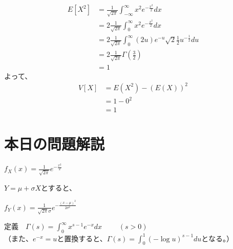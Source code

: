 \documentclass[a4j,uplatex,dvipdfmx]{jsarticle}
\begin{document}
\begin{itemize}
  \begin{equation}
    \begin{split}
      E[X^2]&=\frac{1}{\sqrt{2\pi}} \int_{-\infty}^{\infty} x^2 e^{-\frac{x^2}{2}}dx \\
      &= 2 \frac{1}{\sqrt{2\pi}} \int_{0}^{\infty} x^2e^{-\frac{x^2}{2}} dx \\
      &= 2 \frac{1}{\sqrt{2\pi}} \int_{0}^{\infty} (2u)e^{-u} \sqrt{2} \frac{1}{2}u^{-\frac{1}{2}}du \\
      &= 2 \frac{1}{\sqrt{2\pi}} \Gamma \left( \frac{3}{2} \right) \\
      &= 1
    \end{split}
  \end{equation}
  よって、
  \begin{equation}
    \begin{split}
      V[X]&=E(X^2)-(E(X))^2 \\
      &= 1-0^2 \\
      &=1 
    \end{split}
  \end{equation}
\end{itemize}


\section*{本日の問題解説}
\begin{tcolorbox}[
  title = 標準正規分布,
]
  \begin{center}
    $\displaystyle f_X(x)=\frac{1}{\sqrt{2\pi}} e^{-\frac{x^2}{2}}$
  \end{center}
  \end{tcolorbox}
  
\begin{tcolorbox}[
  title = 正規分布,
  ]
  $Y=\mu + \sigma X$とすると、
  \begin{center}
    $\displaystyle f_Y(x)=\frac{1}{\sqrt{2\pi}\sigma} e^{-\frac{(x-\mu)^2}{2\sigma ^2}}$
  \end{center}
  \end{tcolorbox}

\begin{tcolorbox}[
  title = ガンマ関数,
  ]
    定義　$\displaystyle \Gamma (s)=\int_{0}^{\infty}x^{s-1}e^{-x}dx$ \ \ \ \ $(s>0)$ \\
    （また、$e^{-x}=u$と置換すると、$\displaystyle \Gamma (s)=\int_{0}^{1}(-\log u)^{s-1} du$となる。）
  \end{tcolorbox}
\end{document}
